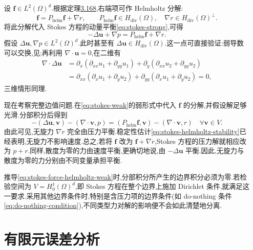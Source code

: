 \begin{note}[动量方程右端各部分的平衡]\label{note:force-on-velocity-pressure}
设 $\bm{f}\in L^2(\Omega)^d$.根据定理\hyperref[thm:helmholtz-decomposition]{3.168},右端项可作 Helmholtz 分解:
\[
  \bm{f}=P_{\mathrm{helm}}\bm{f}+\nabla r,
  \qquad P_{\mathrm{helm}}\bm{f}\in H_{\mathrm{div}}(\Omega),
  \quad \nabla r\in H_{\mathrm{div}}(\Omega)^\perp.
\]
将此分解代入 Stokes 方程的动量平衡\cref{eq:stokes-strong},可得
\begin{equation}\label{eq:stokes-force-helmholtz-strong}
  -\Delta\bm{u}+\nabla p
    =P_{\mathrm{helm}}\bm{f}+\nabla r.
\end{equation}
假设 $\Delta\bm{u},\nabla p\in L^2(\Omega)^d$.此时甚至有 $\Delta\bm{u}\in H_{\mathrm{div}}(\Omega)$.这一点可直接验证:弱导数可以交换,见\textcite[第 5.2.3 节,定理 1]{Evans2010};再利用 $\nabla\cdot\bm{u}=0$,在二维有
\[
\begin{aligned}
  \nabla\cdot\Delta\bm{u}
   &=\partial_x(\partial_{xx}u_1+\partial_{yy}u_1)
       +\partial_y(\partial_{xx}u_2+\partial_{yy}u_2)\\
   &=\partial_{xx}(\partial_xu_1+\partial_yu_2)
       +\partial_{yy}(\partial_xu_1+\partial_yu_2)=0,
\end{aligned}
\]
三维情形同理.

现在考察完整边值问题.在\cref{eq:stokes-weak}的弱形式中代入 $\bm{f}$ 的分解,并假设解足够光滑.分部积分后得到
\begin{equation}\label{eq:stokes-force-helmholtz-weak}
  -(\Delta\bm{u},\bm{v})
    -(\nabla\cdot\bm{v},p)
   =(P_{\mathrm{helm}}\bm{f},\bm{v})
      -(\nabla\cdot\bm{v},r)
      \quad\forall\bm{v}\in V.
\end{equation}
由此可见,无旋力 $\nabla r$ 完全由压力平衡.稳定性估计\cref{eq:stokes-helmholtz-stability}已经表明,无旋力不影响速度.总之,若将 $\bm{f}$ 改为 $\bm{f}+\nabla r$,Stokes 方程的压力解就相应改为 $p+r$.同样,散度为零的力由速度平衡,更确切地说,由 $-\Delta\bm{u}$ 平衡.因此,无旋力与散度为零的力分别由不同变量承担平衡.

推导\cref{eq:stokes-force-helmholtz-weak}时,分部积分所产生的边界积分必须为零.若检验空间为 $V=H_0^1(\Omega)^d$,即 Stokes 方程在整个边界上施加 Dirichlet 条件,就满足这一要求.采用其他边界条件时,特别是含压力项的边界条件(如 do-nothing 条件\cref{eq:do-nothing-condition}),不同类型力对解的影响便不会如此清楚地分离.
\end{note}

\section{有限元误差分析}\label{sec:stokes-finite-element-error-analysis}


